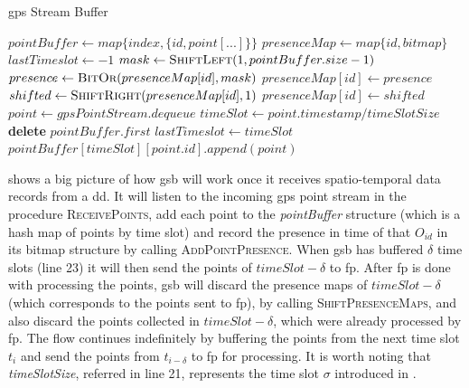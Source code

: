 \begin{algorithm}[h!]
\caption{\ac{gps} Stream Buffer}
\label{alg:gpsb}
\begin{algorithmic}[1]
    \State $pointBuffer \gets map\{index, \{id, point[...]\}\}$
    \State $presenceMap \gets map\{id, bitmap\}$
    \State $lastTimeslot \gets -1$
    \State
        \State $mask \gets \Call{ShiftLeft}{1, pointBuffer.size - 1}$
        \State $presence \gets \Call{BitOr}{presenceMap[id], mask}$
        \State $presenceMap[id] \gets presence$
    \EndProcedure
    \State
            \State $shifted \gets \Call{ShiftRight}{presenceMap[id], 1}$
            \State $presenceMap[id] \gets shifted$
        \EndFor
    \EndProcedure
    \State
        \Loop
            \State $point \gets gpsPointStream.dequeue$
            \State $timeSlot \gets point.timestamp / timeSlotSize$
                    \State {}
                    \State \textbf{delete} $pointBuffer.first$
                    \State {}
                \EndIf
                \State $lastTimeslot \gets timeSlot$
            \EndIf
            \State $pointBuffer[timeSlot][point.id].append(point)$
            \State {}
        \EndLoop
    \EndProcedure
\end{algorithmic}
\end{algorithm}

 shows a big picture of how \ac{gsb} will work once it receives spatio-temporal data records from a
\ac{dd}. It will listen to the incoming \ac{gps} point stream in the procedure \textsc{ReceivePoints}, add each point to
the \textit{pointBuffer} structure (which is a hash map of points by time slot) and record the presence in time of that
$O_{id}$ in its bitmap structure by calling \textsc{AddPointPresence}. When \ac{gsb} has buffered $\delta$ time slots
(line 23) it will then send the points of $timeSlot - \delta$ to \ac{fp}. After \ac{fp} is done with processing the
points, \ac{gsb} will discard the presence maps of $timeSlot - \delta$ (which corresponds to the points sent to
\ac{fp}), by calling \textsc{ShiftPresenceMaps}, and also discard the points collected in $timeSlot - \delta$, which
were already processed by \ac{fp}. The flow continues indefinitely by buffering the points from the next time slot $t_i$
and send the points from $t_{i - \delta}$ to \ac{fp} for processing. It is worth noting that \textit{timeSlotSize},
referred in line 21, represents the time slot $\sigma$ introduced in .

